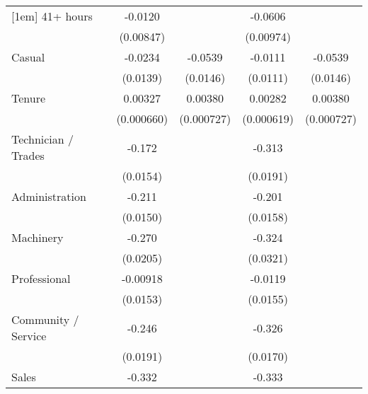 {\begin{tabular}{l*{4}{c}}
[1em]
41+ hours           &     -0.0120         &                     &     -0.0606\sym{***}&                     \\
                    &   (0.00847)         &                     &   (0.00974)         &                     \\
[1em]
Casual              &     -0.0234         &     -0.0539\sym{***}&     -0.0111         &     -0.0539\sym{***}\\
                    &    (0.0139)         &    (0.0146)         &    (0.0111)         &    (0.0146)         \\
[1em]
Tenure              &     0.00327\sym{***}&     0.00380\sym{***}&     0.00282\sym{***}&     0.00380\sym{***}\\
                    &  (0.000660)         &  (0.000727)         &  (0.000619)         &  (0.000727)         \\
[1em]
Technician / Trades &      -0.172\sym{***}&                     &      -0.313\sym{***}&                     \\
                    &    (0.0154)         &                     &    (0.0191)         &                     \\
[1em]
Administration      &      -0.211\sym{***}&                     &      -0.201\sym{***}&                     \\
                    &    (0.0150)         &                     &    (0.0158)         &                     \\
[1em]
Machinery           &      -0.270\sym{***}&                     &      -0.324\sym{***}&                     \\
                    &    (0.0205)         &                     &    (0.0321)         &                     \\
[1em]
Professional        &    -0.00918         &                     &     -0.0119         &                     \\
                    &    (0.0153)         &                     &    (0.0155)         &                     \\
[1em]
Community / Service &      -0.246\sym{***}&                     &      -0.326\sym{***}&                     \\
                    &    (0.0191)         &                     &    (0.0170)         &                     \\
[1em]
Sales               &      -0.332\sym{***}&                     &      -0.333\sym{***}&                     \\

\end{tabular}}
